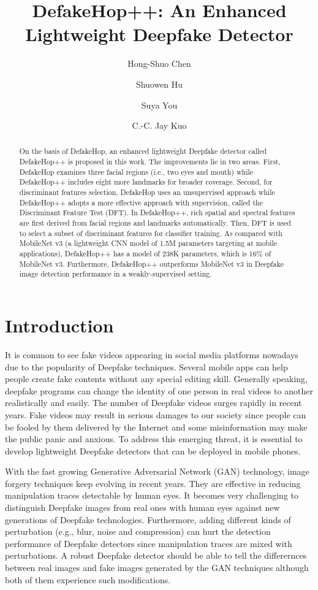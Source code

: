 \documentclass[main, biber]{now-journal}
\title{DefakeHop++: An Enhanced Lightweight Deepfake Detector}
\author[1]{Hong-Shuo Chen}
\author[2]{Shuowen Hu}
\author[2]{Suya You}
\author[1]{C.-C. Jay Kuo}
\affil{University of Southern California, Los Angeles, California, USA}
\affil{Army Research Laboratory, Adelphi, Maryland, USA}
\begin{document}
\begin{abstract}

On the basis of DefakeHop, an enhanced lightweight Deepfake detector
called DefakeHop++ is proposed in this work.  The improvements lie in
two areas.  First, DefakeHop examines three facial regions (i.e., two
eyes and mouth) while DefakeHop++ includes eight more landmarks for
broader coverage. Second, for discriminant features selection, DefakeHop
uses an unsupervised approach while DefakeHop++ adopts a more effective
approach with supervision, called the Discriminant Feature Test (DFT).
In DefakeHop++, rich spatial and spectral features are first derived
from facial regions and landmarks automatically. Then, DFT is used to
select a subset of discriminant features for classifier training. As
compared with MobileNet v3 (a lightweight CNN model of 1.5M parameters
targeting at mobile applications), DefakeHop++ has a model of 238K
parameters, which is 16\% of MobileNet v3.  Furthermore, DefakeHop++
outperforms MobileNet v3 in Deepfake image detection performance in a
weakly-supervised setting. 

\end{abstract}

\section{Introduction}\label{sec:introduction}

It is common to see fake videos appearing in social media platforms
nowadays due to the popularity of Deepfake techniques.  Several mobile
apps can help people create fake contents without any special editing
skill.  Generally speaking, deepfake programs can change the identity of
one person in real videos to another realistically and easily.  The
number of Deepfake videos surges rapidly in recent years.  Fake videos
may result in serious damages to our society since people can be fooled
by them delivered by the Internet and some misinformation may make the
public panic and anxious. To address this emerging threat, it is
essential to develop lightweight Deepfake detectors that can be deployed
in mobile phones. 

With the fast growing Generative Adversarial Network (GAN) technology,
image forgery techniques keep evolving in recent years. They are
effective in reducing manipulation traces detectable by human eyes.  It
becomes very challenging to distinguish Deepfake images from real ones
with human eyes against new generations of Deepfake technologies.
Furthermore, adding different kinds of perturbation (e.g., blur, noise
and compression) can hurt the detection performance of Deepfake
detectors since manipulation traces are mixed with perturbations.  A
robust Deepfake detector should be able to tell the differernces between
real images and fake images generated by the GAN techniques although
both of them experience such modifications. 
\end{document}
